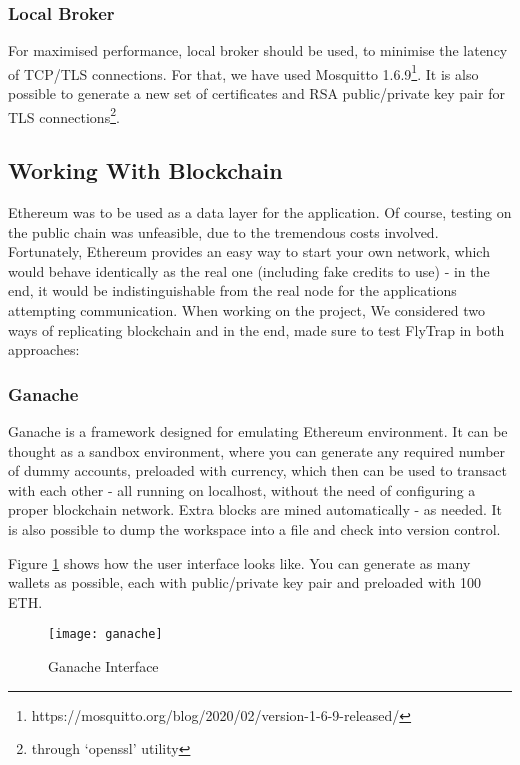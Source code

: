 \subsubsection{Local Broker}
For maximised performance, local broker should be used, to minimise the latency of TCP/TLS connections. For that, we have used Mosquitto 1.6.9\footnote{https://mosquitto.org/blog/2020/02/version-1-6-9-released/}. It is also possible to generate a new set of certificates and RSA public/private key pair for TLS connections\footnote{through `openssl' utility}.  
\subsection{Working With Blockchain}
Ethereum was to be used as a data layer for the application. Of course, testing on the public chain was unfeasible, due to the tremendous costs involved. Fortunately, Ethereum provides an easy way to start your own network, which would behave identically as the real one (including fake credits to use) - in the end, it would be indistinguishable from the real node for the applications attempting communication. When working on the project, We considered two ways of replicating blockchain and in the end, made sure to test FlyTrap in both approaches:
\subsubsection{Ganache}
Ganache\cite{lee2019testing} is a framework designed for emulating Ethereum environment. It can be thought as a sandbox environment, where you can generate any required number of dummy accounts, preloaded with currency, which then can be used to transact with each other - all running on localhost, without the need of configuring a proper blockchain network. Extra blocks are mined automatically - as needed. It is also possible to dump the workspace into a file and check into version control.

Figure \ref{fig:ganache} shows how the user interface looks like. You can generate as many wallets as possible, each with public/private key pair and preloaded with 100 ETH.
\begin{figure}[h]
    \centering
    \texttt{[image: ganache]}
    \caption{Ganache Interface}
    \label{fig:ganache}
\end{figure}

